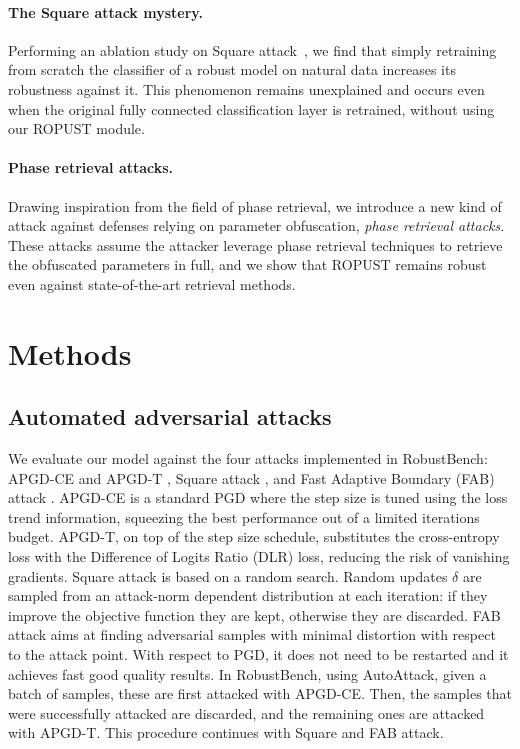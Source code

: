\paragraph{The Square attack mystery.} Performing an ablation study on Square attack~\cite{andriushchenko2019square}, we find that simply retraining from scratch the classifier of a robust model on natural data increases its robustness against it. This phenomenon remains unexplained and occurs even when the original fully connected classification layer is retrained, without using our ROPUST module.

\paragraph{Phase retrieval attacks.} Drawing inspiration from the field of phase retrieval, we introduce a new kind of attack against defenses relying on parameter obfuscation, \emph{phase retrieval attacks}. These attacks assume the attacker leverage phase retrieval techniques to retrieve the obfuscated parameters in full, and we show that ROPUST remains robust even against state-of-the-art retrieval methods.

\section{Methods}\label{sec:methods}


\subsection{Automated adversarial attacks}
We evaluate our model against the four attacks implemented in RobustBench: APGD-CE and APGD-T \cite{Croce2020ReliableEO}, Square attack \cite{andriushchenko2019square}, and Fast Adaptive Boundary (FAB) attack \cite{Croce2020MinimallyDA}. APGD-CE is a standard PGD where the step size is tuned using the loss trend information, squeezing the best performance out of a limited iterations budget. APGD-T, on top of the step size schedule, substitutes the cross-entropy loss with the Difference of Logits Ratio (DLR) loss, reducing the risk of vanishing gradients. Square attack is based on a random search. Random updates $\delta$ are sampled from an attack-norm dependent distribution at each iteration: if they improve the objective function they are kept, otherwise they are discarded. FAB attack aims at finding adversarial samples with minimal distortion with respect to the attack point. With respect to PGD, it does not need to be restarted and it achieves fast good quality results. In RobustBench, using AutoAttack, given a batch of samples, these are first attacked with APGD-CE. Then, the samples that were successfully attacked are discarded, and the remaining ones are attacked with APGD-T. This procedure continues with Square and FAB attack.

